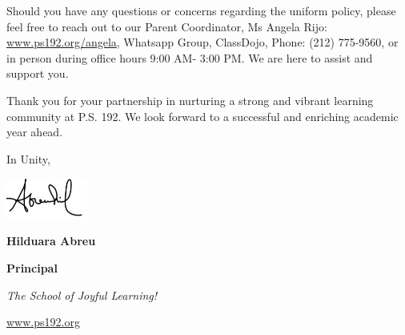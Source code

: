 \documentclass[12pt,letterpaper]{article}
\begin{document}
Should you have any questions or concerns regarding the uniform policy, please
feel free to reach out to our Parent Coordinator, Ms Angela Rijo: 
\url{www.ps192.org/angela}, Whatsapp Group, ClassDojo, Phone: (212) 775-9560, or in person during office hours 9:00 AM- 3:00 PM. We are here to assist and support you.

Thank you for your partnership in nurturing a strong and vibrant learning community at P.S. 192. We look forward to a successful and enriching academic year ahead.


In Unity,

\includegraphics[width=0.2\textwidth]{hil_signature}

\textbf{Hilduara Abreu}

\textbf{Principal}

\textit{The School of Joyful Learning!}

\url{www.ps192.org}
\end{document}
